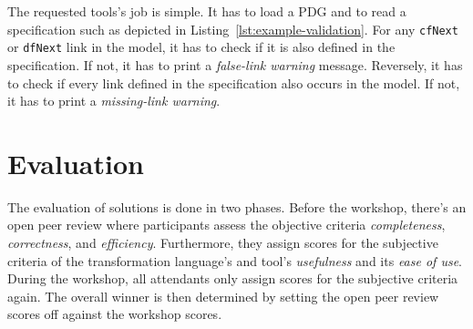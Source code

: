 \documentclass[submission]{eptcs}
\begin{document}
The requested tools's job is simple.  It has to load a PDG and to read a
specification such as depicted in Listing~\ref{lst:example-validation}.  For
any \verb|cfNext| or \verb|dfNext| link in the model, it has to check if it is
also defined in the specification.  If not, it has to print a \emph{false-link
  warning} message.  Reversely, it has to check if every link defined in the
specification also occurs in the model.  If not, it has to print a
\emph{missing-link warning}.


\section{Evaluation}
\label{sec:evaluation-criteria}

The evaluation of solutions is done in two phases.  Before the workshop,
there's an open peer review where participants assess the objective criteria
\emph{completeness}, \emph{correctness}, and \emph{efficiency}.  Furthermore,
they assign scores for the subjective criteria of the transformation language's
and tool's \emph{usefulness} and its \emph{ease of use}.  During the workshop,
all attendants only assign scores for the subjective criteria again.  The
overall winner is then determined by setting the open peer review scores off
against the workshop scores.



\end{document}
